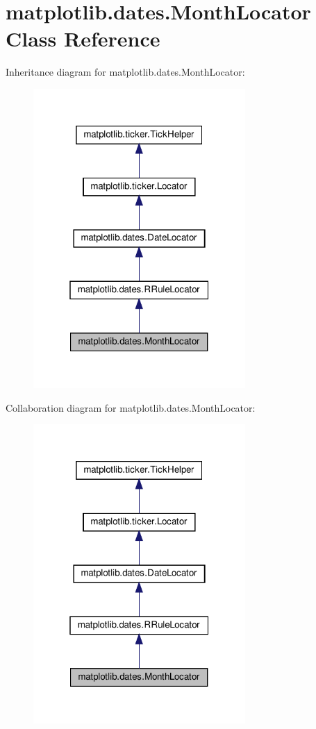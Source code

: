 \hypertarget{classmatplotlib_1_1dates_1_1MonthLocator}{}\section{matplotlib.\+dates.\+Month\+Locator Class Reference}
\label{classmatplotlib_1_1dates_1_1MonthLocator}


Inheritance diagram for matplotlib.\+dates.\+Month\+Locator\+:
\nopagebreak
\begin{figure}[H]
\begin{center}
\leavevmode
\includegraphics[width=229pt]{classmatplotlib_1_1dates_1_1MonthLocator__inherit__graph}
\end{center}
\end{figure}


Collaboration diagram for matplotlib.\+dates.\+Month\+Locator\+:
\nopagebreak
\begin{figure}[H]
\begin{center}
\leavevmode
\includegraphics[width=229pt]{classmatplotlib_1_1dates_1_1MonthLocator__coll__graph}
\end{center}
\end{figure}
